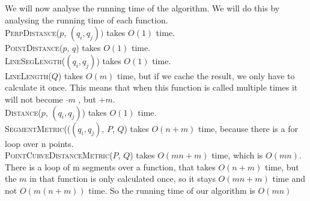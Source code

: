 \documentclass[a4paper,11pt]{article}
\begin{document}
 
	
	
We will now analyse the running time of the algorithm. 
We will do this by analysing the running time of each function.\\
\textsc{PerpDistance}($p$, $(q_i, q_j))$ takes $O(1)$ time.\\
\textsc{PointDistance}($p$, $q$) takes $O(1)$ time. \\
\textsc{LineSegLength}($(q_i, q_j)$) takes $O(1)$ time. \\
\textsc{LineLength}($Q$) takes $O(m)$ time, but if we cache the result, we only have to calculate it once. This means that when this function is called multiple times it will not become $\cdot m$ , but $+m$.\\
\textsc{Distance}($p$, $(q_i, q_j)$) takes $O(1)$ time.\\
\textsc{SegmentMetric}(($(q_i, q_j)$, $P$, $Q$) takes $O(n+m)$ time, because there is a for loop over n points. \\
\textsc{PointCurveDistanceMetric}($P$, $Q$)  takes $O(mn + m)$ time, which is $O(mn)$. 
There is a loop of m segments over a function, that takes $O(n+m)$ time, but the $m$ in that function is only calculated once, so it stays $O(mn+m)$ time and not $O(m(n+m))$ time.
So the running time of our algorithm is  $O(mn)$ \\
\end{document}
